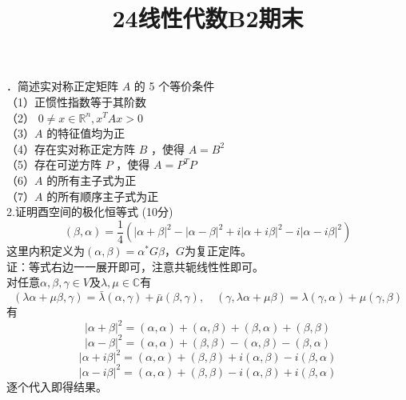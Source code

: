 \documentclass[UTF8]{ctexart}
\title{24线性代数B2期末}
\author{\calligra{NULIOUS}}
\date{}
\begin{document}
\maketitle
{}．简述实对称正定矩阵 $A$ 的 5 个等价条件\\
（1）正惯性指数等于其阶数\\
（2） $0 \neq x \in \mathbb{R}^n, x^T A x>0$\\
（3）$A$ 的特征值均为正\\
（4）存在实对称正定方阵 $B$ ，使得 $A=B^2$\\
（5）存在可逆方阵 $P$ ，使得 $A=P^T P$\\
（6）$A$ 的所有主子式为正\\
（7）$A$ 的所有顺序主子式为正\\
	
		
\noindent 2.证明酉空间的极化恒等式 (10分)
\[
		(\beta, \alpha) = \frac{1}{4} \left(|\alpha + \beta|^2 - |\alpha - \beta|^2 + i|\alpha + i\beta|^2 - i|\alpha - i\beta|^2\right)
\]
这里内积定义为$(\alpha, \beta)=\alpha^* G \beta$，$G$为复正定阵。\\
证：等式右边一一展开即可，注意共轭线性性即可。\\
对任意$\alpha, \beta, \gamma \in V$及$\lambda, \mu \in \mathbb{C}$有
		\[
		(\lambda \alpha + \mu \beta, \gamma) = \bar{\lambda}(\alpha, \gamma) + \bar{\mu}(\beta, \gamma), \quad (\gamma, \lambda \alpha + \mu \beta) = \lambda (\gamma, \alpha) + \mu (\gamma, \beta)
		\]
		有
		\[
		|\alpha + \beta|^2 = (\alpha, \alpha) + (\alpha, \beta) + (\beta, \alpha) + (\beta, \beta)
		\]
		\[
		|\alpha - \beta|^2 = (\alpha, \alpha) + (\beta, \beta) - (\alpha, \beta) - (\beta, \alpha)
		\]
		\[
		|\alpha + i\beta|^2 = (\alpha, \alpha) + (\beta, \beta) + i(\alpha, \beta) - i(\beta, \alpha)
		\]
		\[
		|\alpha - i\beta|^2 = (\alpha, \alpha) + (\beta, \beta) - i(\alpha, \beta) + i(\beta, \alpha)
		\]
		逐个代入即得结果。\\
		
\end{document}
